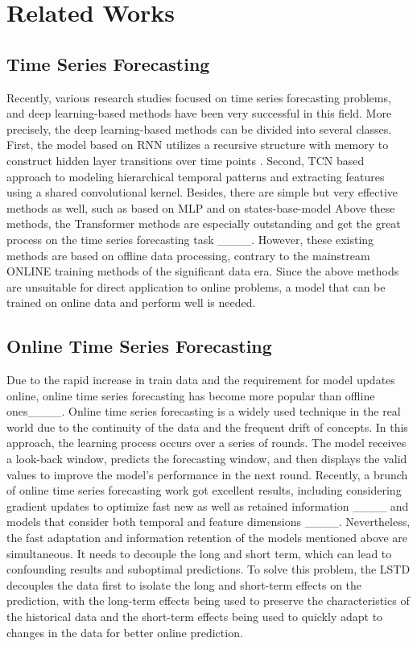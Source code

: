 \section{Related Works}
\subsection{Time Series Forecasting}
Recently, various research studies focused on time series forecasting problems, and deep learning-based methods have been very successful in this field. More precisely, the deep learning-based methods can be divided into several classes. First, the model based on RNN utilizes a recursive structure with memory to construct hidden layer transitions over time points . Second, TCN based approach to modeling hierarchical temporal patterns and extracting features using a shared convolutional kernel. Besides, there are simple but very effective methods as well, such as based on MLP  and on states-base-model  
Above these methods, the Transformer methods are especially outstanding and get the great process on the time series forecasting task ____.
However, these existing methods are based on offline data processing, contrary to the mainstream ONLINE training methods of the significant data era. Since the above methods are unsuitable for direct application to online problems, a model that can be trained on online data and perform well is needed.
\subsection{Online Time Series Forecasting}
Due to the rapid increase in train data and the requirement for model updates online, online time series forecasting has become more popular than offline ones____.
Online time series forecasting is a widely used technique in the real world due to the continuity of the data and the frequent drift of concepts. In this approach, the learning process occurs over a series of rounds. The model receives a look-back window, predicts the forecasting window, and then displays the valid values to improve the model's performance in the next round. Recently, a brunch of online time series forecasting work got excellent results, including considering gradient updates to optimize fast new as well as retained information ____ and models that consider both temporal and feature dimensions ____. Nevertheless, the fast adaptation and information retention of the models mentioned above are simultaneous. It needs to decouple the long and short term, which can lead to confounding results and suboptimal predictions. To solve this problem, the LSTD decouples the data first to isolate the long and short-term effects on the prediction, with the long-term effects being used to preserve the characteristics of the historical data and the short-term effects being used to quickly adapt to changes in the data for better online prediction.
